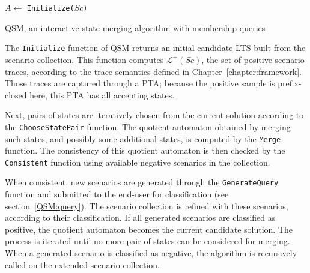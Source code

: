 \begin{algorithm}
{
\vspace{0.2cm}

$A \leftarrow $ {\tt Initialize($Sc$)}\\
}
\vspace{0.2cm}
\caption{\textsc{QSM}, an interactive state-merging algorithm with membership queries\label{QSM}}
\end{algorithm}

The \texttt{Initialize} function of \textsc{QSM} returns an initial candidate LTS built from the scenario collection. This function computes $\mathcal{L}^+(Sc)$, the set of positive scenario traces, according to the trace semantics defined in Chapter~\ref{chapter:framework}. Those traces are captured through a PTA; because the positive sample is prefix-closed here, this PTA has all accepting states.

Next, pairs of states are iteratively chosen from the current solution according to the \texttt{ChooseStatePair} function. The quotient automaton obtained by merging such states, and possibly some additional states, is computed by the \texttt{Merge} function. The consistency of this quotient automaton is then checked by the \texttt{Consistent} function using available negative scenarios in the collection. 

When consistent, new scenarios are generated through the \texttt{GenerateQuery} function and submitted to the end-user for classification (see section~\ref{QSM:query}). The scenario collection is refined with these scenarios, according to their classification. If all generated scenarios are classified as positive, the quotient automaton becomes the current candidate solution. The process is iterated until no more pair of states can be considered for merging. When a generated scenario is classified as negative, the algorithm is recursively called on the extended scenario collection.

